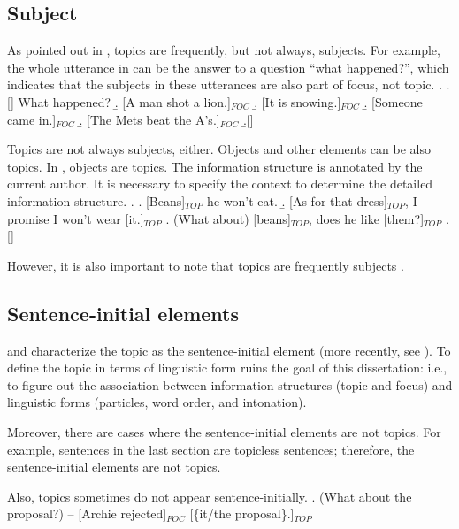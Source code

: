 \subsection{Subject}

As pointed out in ,
topics are frequently, but not always, subjects.
For example, the whole utterance in \Next[a-d] can be the answer to a question ``what happened?'',
which indicates that the subjects in these utterances are also part of focus,
not topic.
%
\ex.
  \a.[] What happened?
  \b. [A man shot a lion.]$_{FOC}$
  \b. [It is snowing.]$_{FOC}$
  \b. [Someone came in.]$_{FOC}$
  \b. [The Mets beat the A's.]$_{FOC}$
  \b.[] \hfill{\cite[p.~49, modified by the current author]{gundel74}}


Topics are not always subjects, either.
Objects and other elements can be also topics.
In \Next,
objects are topics.
The information structure is annotated by the current author.
It is necessary to specify the context to determine the detailed information structure.
%
\ex.
 \a. [Beans]$_{TOP}$ he won't eat.
 \b. [As for that dress]$_{TOP}$, I promise I won't wear [it.]$_{TOP}$
 \b. (What about) [beans]$_{TOP}$, does he like [them?]$_{TOP}$
 \b.[] \hfill{\cite[p.~27, modified by the current author]{gundel74}}

However, it is also important to note that topics are frequently subjects \cite{li76}.


\subsection{Sentence-initial elements}

 and  characterize the topic as the sentence-initial element
(more recently, see ).
To define the topic in terms of linguistic form ruins the goal of this dissertation:
i.e., to figure out the association between information structures (topic and focus) and linguistic forms (particles, word order, and intonation).

Moreover, there are cases where the sentence-initial elements are not topics.
For example, sentences \LLast in the last section are topicless sentences;
therefore, the sentence-initial elements are not topics.

Also, topics sometimes do not appear sentence-initially.
%
\ex. (What about the proposal?) -- [Archie rejected]$_{FOC}$ [\{it/the proposal\}.]$_{TOP}$


